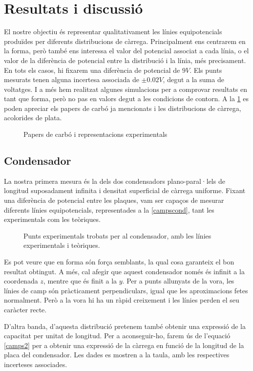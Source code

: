 \section{Resultats i discussió}
El nostre objectiu és representar qualitativament les línies equipotencials produïdes per diferents distribucions de càrrega. Principalment ens centrarem en la forma, però també ens interessa el valor del potencial associat a cada línia, o el valor de la diferència de potencial entre la distribució i la línia, més precisament. En tots els casos, hi fixarem una diferència de potencial de $9V$. Els punts mesurats tenen alguna incertesa associada de $\pm0.02V$, degut a la suma de voltatges. I a més hem realitzat algunes simulacions per a comprovar resultats en tant que forma, però no pas en valors degut a les condicions de contorn. A la \ref{fig:campscarbo} es poden apreciar els papers de carbó ja mencionats i les distribucions de càrrega, acolorides de plata.

\begin{figure}[htb]
  \centering
  \caption{Papers de carbó i representacions experimentals}
  \label{fig:campscarbo}
\end{figure}
\subsection{Condensador}
La nostra primera mesura és la dels dos condensadors plano-paral·lels de longitud suposadament infinita i densitat superficial de càrrega uniforme. Fixant una diferència de potencial entre les plaques, vam ser capaços de mesurar diferents línies equipotencials, representades a la \ref{campscond}, tant les experimentals com les teòriques.

\begin{figure}[htb]
  \centering
  \caption{ Punts experimentals trobats per al condensador, amb les línies experimentals i teòriques.}
  \label{fig:campscond}
\end{figure}

Es pot veure que en forma són força semblants, la qual cosa garanteix el bon resultat obtingut. A més, cal afegir que aquest condensador només és infinit a la coordenada $z$, mentre que és finit a la $y$. Per a punts allunyats de la vora, les línies de camp són pràcticament perpendiculars, igual que les aproximacions fetes normalment. Però a la vora hi ha un ràpid creixement i les línies perden el seu caràcter recte.

D'altra banda, d'aquesta distribució pretenem també obtenir una expressió de la capacitat per unitat de longitud. Per a aconseguir-ho, farem ús de l'equació \ref{camps2} per a obtenir una expressió de la càrrega en funció de la longitud de la placa del condensador. Les dades es mostren a la taula, amb les respectives incerteses associades. 

